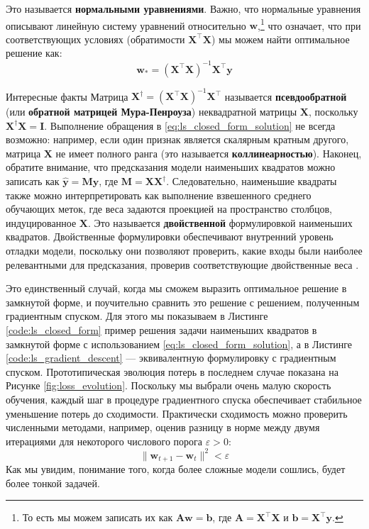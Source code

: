 Это называется \textbf{нормальными уравнениями}. Важно, что нормальные уравнения описывают линейную систему уравнений относительно $\mathbf{w}$,\footnote{То есть мы можем записать их как $\mathbf{A}\mathbf{w}=\mathbf{b}$, где $\mathbf{A} = \mathbf{X}^\top\mathbf{X}$ и $\mathbf{b} = \mathbf{X}^\top\mathbf{y}$.} что означает, что при соответствующих условиях (обратимости $\mathbf{X}^\top\mathbf{X}$) мы можем найти оптимальное решение как:
%
\begin{equation}
\mathbf{w}_*=\left(\mathbf{X}^\top\mathbf{X}\right)^{-1}\mathbf{X}^\top\mathbf{y}
\label{eq:ls_closed_form_solution}
\end{equation}

\begin{supportbox}{Интересные факты}
Матрица $\mathbf{X}^\dagger=\left(\mathbf{X}^\top\mathbf{X}\right)^{-1}\mathbf{X}^\top$ называется \textbf{псевдообратной} (или \textbf{обратной матрицей Мура-Пенроуза}) неквадратной матрицы $\mathbf{X}$, поскольку $\mathbf{X}^\dagger\mathbf{X}=\mathbf{I}$. Выполнение обращения в \eqref{eq:ls_closed_form_solution} не всегда возможно: например, если один признак является скалярным кратным другого, матрица $\mathbf{X}$ не имеет полного ранга (это называется \textbf{коллинеарностью}). Наконец, обратите внимание, что предсказания модели наименьших квадратов можно записать как $\hat{\mathbf{y}}=\mathbf{M}\mathbf{y}$, где $\mathbf{M} = \mathbf{X}\mathbf{X}^\dagger$. Следовательно, наименьшие квадраты также можно интерпретировать как выполнение взвешенного среднего обучающих меток, где веса задаются проекцией на пространство столбцов, индуцированное $\mathbf{X}$. Это называется \textbf{двойственной} формулировкой наименьших квадратов. Двойственные формулировки обеспечивают внутренний уровень отладки модели, поскольку они позволяют проверить, какие входы были наиболее релевантными для предсказания, проверив соответствующие двойственные веса \cite{irie2022dual}. 
\end{supportbox}

Это единственный случай, когда мы сможем выразить оптимальное решение в замкнутой форме, и поучительно сравнить это решение с решением, полученным градиентным спуском. Для этого мы показываем в Листинге \ref{code:ls_closed_form} пример решения задачи наименьших квадратов в замкнутой форме с использованием \eqref{eq:ls_closed_form_solution}, а в Листинге \ref{code:ls_gradient_descent} — эквивалентную формулировку с градиентным спуском. Прототипическая эволюция потерь в последнем случае показана на Рисунке \ref{fig:loss_evolution}. Поскольку мы выбрали очень малую скорость обучения, каждый шаг в процедуре градиентного спуска обеспечивает стабильное уменьшение потерь до сходимости. Практически сходимость можно проверить численными методами, например, оценив разницу в норме между двумя итерациями для некоторого числового порога $\varepsilon > 0$:
%
\begin{equation}
    \lVert \mathbf{w}_{t+1} - \mathbf{w}_t \rVert^2 < \varepsilon
\end{equation}
%
Как мы увидим, понимание того, когда более сложные модели сошлись, будет более тонкой задачей.

